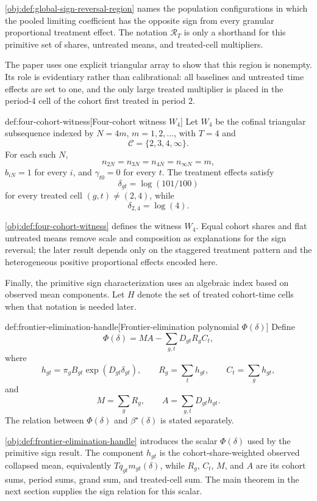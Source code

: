\documentclass[11pt]{article}
\begin{document}
\cref{obj:def:global-sign-reversal-region} names the population configurations in which the pooled limiting coefficient has the opposite sign from every granular proportional treatment effect. The notation \(\mathcal R_T\) is only a shorthand for this primitive set of shares, untreated means, and treated-cell multipliers.

The paper uses one explicit triangular array to show that this region is nonempty. Its role is evidentiary rather than calibrational: all baselines and untreated time effects are set to one, and the only large treated multiplier is placed in the period-4 cell of the cohort first treated in period 2.

\begin{definitionv}{def:four-cohort-witness}[Four-cohort witness $W_4$]
Let $W_4$ be the cofinal triangular subsequence indexed by $N=4m$, $m=1,2,\ldots$, with $T=4$ and
\[
\mathcal C=\{2,3,4,\infty\}.
\]
For each such $N$,
\[
n_{2N}=n_{3N}=n_{4N}=n_{\infty N}=m,
\]
$b_{iN}=1$ for every $i$, and $\gamma_{t0}=0$ for every $t$. The treatment effects satisfy
\[
\delta_{gt}=\log(101/100)
\]
for every treated cell $(g,t)\ne(2,4)$, while
\[
\delta_{2,4}=\log(4).
\]
\end{definitionv}

\cref{obj:def:four-cohort-witness} defines the witness \(W_4\). Equal cohort shares and flat untreated means remove scale and composition as explanations for the sign reversal; the later result depends only on the staggered treatment pattern and the heterogeneous positive proportional effects encoded here.

Finally, the primitive sign characterization uses an algebraic index based on observed mean components. Let \(H\) denote the set of treated cohort-time cells when that notation is needed later.

\begin{definitionv}{def:frontier-elimination-handle}[Frontier-elimination polynomial $\Phi(\delta)$]
Define
\[
\Phi(\delta)
=
M A
-
\sum_{g,t} D_{gt} R_g C_t,
\]
where
\[
h_{gt}
=
\pi_g B_{gt}\exp(D_{gt}\delta_{gt}),\qquad
R_g=\sum_t h_{gt},\qquad
C_t=\sum_g h_{gt},
\]
and
\[
M=\sum_g R_g,\qquad
A=\sum_{g,t}D_{gt}h_{gt}.
\]
The relation between $\Phi(\delta)$ and $\beta^\star(\delta)$ is stated separately.
\end{definitionv}

\cref{obj:def:frontier-elimination-handle} introduces the scalar \(\Phi(\delta)\) used by the primitive sign result. The component \(h_{gt}\) is the cohort-share-weighted observed collapsed mean, equivalently \(Tq_{gt}m_{gt}(\delta)\), while \(R_g\), \(C_t\), \(M\), and \(A\) are its cohort sums, period sums, grand sum, and treated-cell sum. The main theorem in the next section supplies the sign relation for this scalar.
\end{document}
